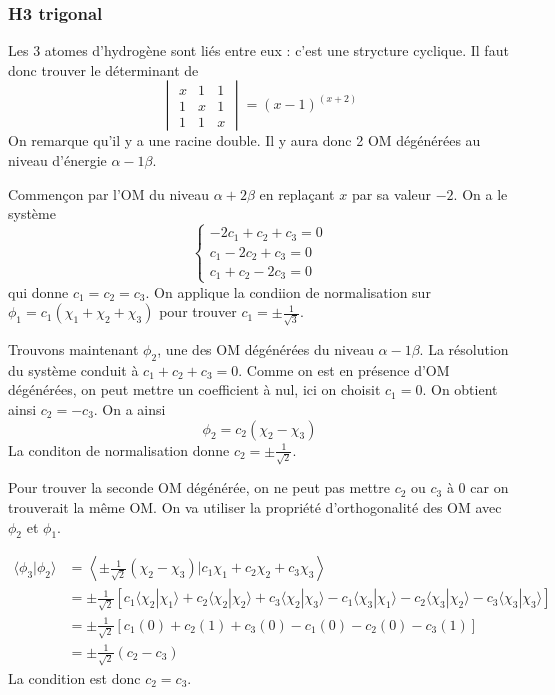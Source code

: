 \documentclass[french]{yLectureNote}
\begin{document}
\subsubsection{H3 trigonal}
Les 3 atomes d'hydrogène sont liés entre eux : c'est une strycture cyclique. Il faut donc trouver le déterminant de \[\begin{vmatrix}
x&1&1\\
1&x&1\\
1&1&x
\end{vmatrix} = (x-1)^(x+2)\] On remarque qu'il y a une racine double. Il y aura donc 2 OM dégénérées au niveau d'énergie \(\alpha-1\beta\).

Commençon par l'OM du niveau \(\alpha+2\beta\) en replaçant \(x\) par sa valeur \(-2\). On a le système \[\left\{\begin{matrix}
-2c_1+c_2+c_3=0\\
c_1-2c_2+c_3=0\\
c_1+c_2-2c_3=0
\end{matrix}\right.\] qui donne \(c_1=c_2=c_3\). On applique la condiion de normalisation sur \(\phi_1 = c_1(\chi_1+\chi_2+\chi_3)\) pour trouver \(c_1 = \pm \frac{1}{\sqrt{3}}\).

Trouvons maintenant \(\phi_2\), une des OM dégénérées du niveau \(\alpha-1\beta\). La résolution du système conduit à \(c_1+c_2+c_3 =0\). Comme on est en présence d'OM dégénérées, on peut mettre un coefficient à nul, ici on choisit \(c_1 = 0\). On obtient ainsi \(c_2=-c_3\). On a ainsi \[\phi_2 = c_2(\chi_2-\chi_3)\]La conditon de normalisation donne \(c_2 = \pm \frac{1}{\sqrt{2}}\).

Pour trouver la seconde OM dégénérée, on ne peut pas mettre \(c_2\) ou \(c_3\) à 0 car on trouverait la m\^eme OM. On va utiliser la propriété d'orthogonalité des OM avec \(\phi_2\) et \(\phi_1\).


\begin{align*}
\langle \phi_3 | \phi_2 \rangle &= \left\langle \pm \frac{1}{\sqrt{2}}(\chi_2 - \chi_3) \bigg| c_1\chi_1 + c_2\chi_2 + c_3\chi_3 \right\rangle \\
&= \pm \frac{1}{\sqrt{2}} \left[ c_1\langle\chi_2|\chi_1\rangle + c_2\langle\chi_2|\chi_2\rangle + c_3\langle\chi_2|\chi_3\rangle - c_1\langle\chi_3|\chi_1\rangle - c_2\langle\chi_3|\chi_2\rangle - c_3\langle\chi_3|\chi_3\rangle \right] \\
&= \pm \frac{1}{\sqrt{2}} \left[ c_1(0) + c_2(1) + c_3(0) - c_1(0) - c_2(0) - c_3(1) \right] \\
&= \pm \frac{1}{\sqrt{2}} (c_2 - c_3)
\end{align*}
La condition est donc $c_2 = c_3$.
\end{document}
